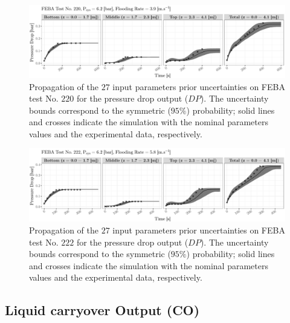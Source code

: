 \begin{figure}[bth]
    \centering
    \includegraphics[width=1.0\textwidth]{../figures/chapter2/figures/plotTraceUQPriorDP220}
    \caption[Propagation of the $27$ input parameters prior uncertainties on FEBA test No. $220$ for the pressure drop output ($DP$).]{Propagation of the $27$ input parameters prior uncertainties on FEBA test No. $220$ for the pressure drop output ($DP$). The uncertainty bounds correspond to the symmetric ($95\%$) probability; solid lines and crosses indicate the simulation with the nominal parameters values and the experimental data, respectively.}
    \label{fig:ch2_plot_trace_uq_prior_dp_220}
\end{figure}

\begin{figure}[!h]
    \centering
    \includegraphics[width=1.0\textwidth]{../figures/chapter2/figures/plotTraceUQPriorDP222}
    \caption[Propagation of the $27$ input parameters prior uncertainties on FEBA test No. $222$ for the pressure drop output ($DP$).]{Propagation of the $27$ input parameters prior uncertainties on FEBA test No. $222$ for the pressure drop output ($DP$). The uncertainty bounds correspond to the symmetric ($95\%$) probability; solid lines and crosses indicate the simulation with the nominal parameters values and the experimental data, respectively.}
    \label{fig:ch2_plot_trace_uq_prior_dp_222}
\end{figure}

\clearpage

\subsection{Liquid carryover Output (CO)}\label{app:tbl_results_uq_feba_co}

